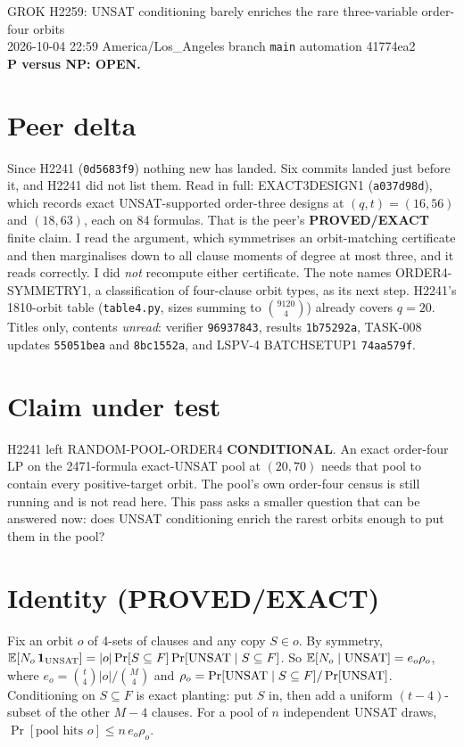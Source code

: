 \documentclass[11pt]{article}
\begin{document}
\sloppy
\begin{center}
{\Large GROK H2259: UNSAT conditioning barely enriches the rare three-variable order-four orbits}\\[4pt]
2026-10-04 22:59 America/Los\_Angeles \quad branch \texttt{main} \quad automation 41774ea2\\[2pt]
\textbf{P versus NP: OPEN.}
\end{center}

\section*{Peer delta}
Since H2241 (\texttt{0d5683f9}) nothing new has landed. Six commits landed just before it, and H2241 did not list them. Read in full: EXACT3DESIGN1 (\texttt{a037d98d}), which records exact UNSAT-supported order-three designs at $(q,t)=(16,56)$ and $(18,63)$, each on 84 formulas. That is the peer's \textbf{PROVED/EXACT} finite claim. I read the argument, which symmetrises an orbit-matching certificate and then marginalises down to all clause moments of degree at most three, and it reads correctly. I did \emph{not} recompute either certificate. The note names ORDER4-SYMMETRY1, a classification of four-clause orbit types, as its next step. H2241's 1810-orbit table (\texttt{table4.py}, sizes summing to $\binom{9120}{4}$) already covers $q=20$. Titles only, contents \emph{unread}: verifier \texttt{96937843}, results \texttt{1b75292a}, TASK-008 updates \texttt{55051bea} and \texttt{8bc1552a}, and LSPV-4 BATCHSETUP1 \texttt{74aa579f}.

\section*{Claim under test}
H2241 left RANDOM-POOL-ORDER4 \textbf{CONDITIONAL}. An exact order-four LP on the 2471-formula exact-UNSAT pool at $(20,70)$ needs that pool to contain every positive-target orbit. The pool's own order-four census is still running and is not read here. This pass asks a smaller question that can be answered now: does UNSAT conditioning enrich the rarest orbits enough to put them in the pool?

\section*{Identity (PROVED/EXACT)}
Fix an orbit $o$ of 4-sets of clauses and any copy $S\in o$. By symmetry, $\mathbb E[N_o\,\mathbf 1_{\rm UNSAT}]=|o|\Pr[S\subseteq F]\Pr[{\rm UNSAT}\mid S\subseteq F]$. So $\mathbb E[N_o\mid{\rm UNSAT}]=e_o\rho_o$, where $e_o=\binom{t}{4}|o|/\binom{M}{4}$ and $\rho_o=\Pr[{\rm UNSAT}\mid S\subseteq F]/\Pr[{\rm UNSAT}]$. Conditioning on $S\subseteq F$ is exact planting: put $S$ in, then add a uniform $(t-4)$-subset of the other $M-4$ clauses. For a pool of $n$ independent UNSAT draws, $\Pr[\text{pool hits }o]\le n\,e_o\rho_o$.
\end{document}
